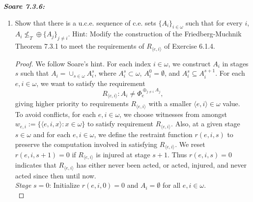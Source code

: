 \documentclass{article}
\begin{document}
\it \textbf{Soare 7.3.6:}
  \begin{enumerate}[label={(\roman*)}]
    \item Show that there is a u.c.e. sequence of c.e. sets
      $\{A_i\}_{i\in\omega}$ such that for every $i$, $A_i\not\leq_T \oplus
      \{A_j\}_{j\neq i}$. Hint: Modify the construction of the
      Friedberg-Muchnik Theorem 7.3.1 to meet the requirements of
      $R_{\langle e,i\rangle}$ of Exercise 6.1.4.

      \begin{proof}
        We follow Soare's hint. For each index $i\in\omega$, we construct
        $A_i$ in stages $s$ such that $A_i=\cup_{s\in\omega}A_i^s$, where
        $A_i^s\subset\omega$, $A_i^0=\emptyset$, and $A_i^s\subseteq
        A_i^{s+1}$. For each $e,i\in\omega$, we want to satisfy the
        requirement \[R_{\langle e,i\rangle}: A_i\neq\Phi_e^{\oplus_{j\neq
        i}A_j},\] giving higher priority to requirements $R_{\langle
        e,i\rangle}$ with a smaller $\langle e,i\rangle\in\omega$ value. \\

        To avoid conflicts, for each $e,i\in\omega$, we choose witnesses
        from amongst $w_{e,i}:=\{\langle e,i,x\rangle: x\in\omega\}$ to
        satisfy requirement $R_{\langle e,i\rangle}$. Also, at a given
        stage $s\in\omega$ and for each $e,i\in\omega$, we define the
        restraint function $r(e,i,s)$ to preserve the computation involved
        in satisfying $R_{\langle e,i\rangle}$. We reset $r(e,i,s+1)=0$ if
        $R_{\langle e,i\rangle}$ is injured at stage $s+1$. Thus
        $r(e,i,s)=0$ indicates that $R_{\langle e,i\rangle}$ has either
        never been acted, or acted, injured, and never acted
        since then until now. \\

        \textit{Stage} $s=0$: Initialize $r(e,i,0)=0$ and $A_i=\emptyset$
        for all $e,i\in\omega$. \\


\end{proof}
\end{enumerate}
\end{document}
